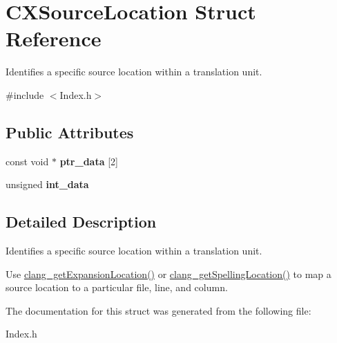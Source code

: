 \hypertarget{structCXSourceLocation}{}\section{C\+X\+Source\+Location Struct Reference}
\label{structCXSourceLocation}


Identifies a specific source location within a translation unit.  




{\ttfamily \#include $<$Index.\+h$>$}

\subsection*{Public Attributes}
\begin{DoxyCompactItemize}
\item 
\mbox{\label{structCXSourceLocation_ac2d5c300a87d200e6542be4a557014a1}} 
const void $\ast$ {\bfseries ptr\+\_\+data} \mbox{[}2\mbox{]}
\item 
\mbox{\label{structCXSourceLocation_ae5a410c0b0b7685f9eca069868e4dc91}} 
unsigned {\bfseries int\+\_\+data}
\end{DoxyCompactItemize}


\subsection{Detailed Description}
Identifies a specific source location within a translation unit. 

Use \hyperlink{group__CINDEX__LOCATIONS_gadee4bea0fa34550663e869f48550eb1f}{clang\+\_\+get\+Expansion\+Location()} or \hyperlink{group__CINDEX__LOCATIONS_ga01f1a342f7807ea742aedd2c61c46fa0}{clang\+\_\+get\+Spelling\+Location()} to map a source location to a particular file, line, and column. 

The documentation for this struct was generated from the following file\+:\begin{DoxyCompactItemize}
\item 
Index.\+h\end{DoxyCompactItemize}

